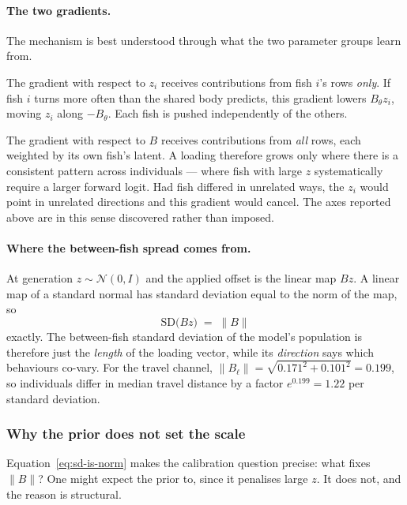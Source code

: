 \paragraph{The two gradients.} The mechanism is best understood through what
the two parameter groups learn from.

The gradient with respect to $z_i$ receives contributions from fish $i$'s rows
\emph{only}. If fish $i$ turns more often than the shared body predicts, this
gradient lowers $B_\theta z_i$, moving $z_i$ along $-B_\theta$. Each fish is
pushed independently of the others.

The gradient with respect to $B$ receives contributions from \emph{all} rows,
each weighted by its own fish's latent. A loading therefore grows only where
there is a consistent pattern across individuals --- where fish with large $z$
systematically require a larger forward logit. Had fish differed in unrelated
ways, the $z_i$ would point in unrelated directions and this gradient would
cancel. The axes reported above are in this sense discovered rather than
imposed.

\paragraph{Where the between-fish spread comes from.} At generation
$z\sim\mathcal{N}(0,I)$ and the applied offset is the linear map $Bz$. A linear
map of a standard normal has standard deviation equal to the norm of the map,
so
\begin{equation}
\mathrm{SD}\bigl(Bz\bigr) \;=\; \lVert B\rVert
\label{eq:sd-is-norm}
\end{equation}
exactly. The between-fish standard deviation of the model's population is
therefore just the \emph{length} of the loading vector, while its
\emph{direction} says which behaviours co-vary. For the travel channel,
$\lVert B_\ell\rVert=\sqrt{0.171^2+0.101^2}=0.199$, so individuals differ in
median travel distance by a factor $e^{0.199}=1.22$ per standard deviation.

\subsubsection{Why the prior does not set the scale}

Equation~\eqref{eq:sd-is-norm} makes the calibration question precise: what
fixes $\lVert B\rVert$? One might expect the prior to, since it penalises large
$z$. It does not, and the reason is structural.

